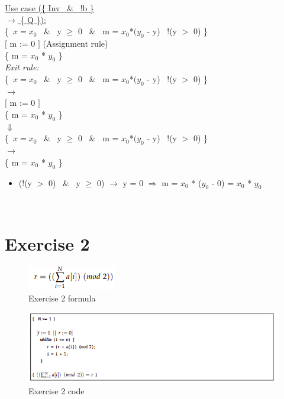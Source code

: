 \documentclass[a4paper,12pt]{article}
\begin{document}
\underline{Use case (\{ Inv \ \& \ !b \} \[ \] $\rightarrow$ \{ Q \}):} \\

\{\ $x = x_{0}$ \ \& \ y $\geq$ 0 \ \& \ m = $x_{0}$*$(y_{0}$ - y) \ !(y $>$ 0) \}\ \\
$[$ m := 0 $]$  (Assignment rule)\\
\{ m = $x_{0}$ * $y_{0}$ \} \\

\textit{Exit rule:}\\
\{\ $x = x_{0}$ \ \& \ y $\geq$ 0 \ \& \ m = $x_{0}$*$(y_{0}$ - y) \ !(y $>$ 0) \}\ \\
$\longrightarrow$ \\
$[$ m := 0 $]$ \\
\{ m = $x_{0}$ * $y_{0}$ \} \\
$\Downarrow$ \\
\{\ $x = x_{0}$ \ \& \ y $\geq$ 0 \ \& \ m = $x_{0}$*$(y_{0}$ - y) \ !(y $>$ 0) \}\ \\
$\longrightarrow$ \\
\{ m = $x_{0}$ * $y_{0}$ \} \\
\begin{itemize}[label = {\checkmark}]
    \item (!(y $>$ 0) \ \& \ y $\geq$ 0) $\rightarrow$ y = 0 $\Rightarrow$ m = $x_{0}$ * ($y_{0}$ - 0) = $x_{0}$ * $y_{0}$
\end{itemize} \\
\newpage

\section{Exercise 2}
\begin{figure}[H]
    \centering
	\includegraphics[scale = 1.0]{images/formula.png}
	\caption{Exercise 2 formula}
	\label{fig:formula1}
\end{figure}
\begin{figure}[H]
    \centering
	\includegraphics[scale = 0.70]{images/codi.png}
	\caption{Exercise 2 code}
	\label{fig:code2}
\end{figure}
\end{document}

